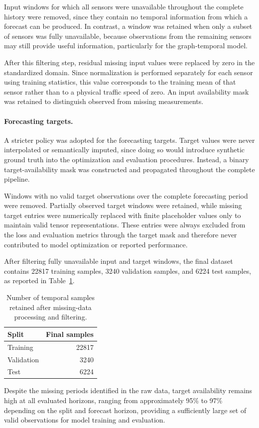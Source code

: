 Input windows for which all sensors were unavailable throughout the complete
history were removed, since they contain no temporal information from which a
forecast can be produced. In contrast, a window was retained when only a
subset of sensors was fully unavailable, because observations from the
remaining sensors may still provide useful information, particularly for the
graph-temporal model.

After this filtering step, residual missing input values were replaced by
zero in the standardized domain. Since normalization is performed separately
for each sensor using training statistics, this value corresponds to the
training mean of that sensor rather than to a physical traffic speed of zero.
An input availability mask was retained to distinguish observed from missing
measurements.

\paragraph{Forecasting targets.}

A stricter policy was adopted for the forecasting targets. Target values were
never interpolated or semantically imputed, since doing so would introduce
synthetic ground truth into the optimization and evaluation procedures.
Instead, a binary target-availability mask was constructed and propagated
throughout the complete pipeline.

Windows with no valid target observations over the complete forecasting
period were removed. Partially observed target windows were retained, while
missing target entries were numerically replaced with finite placeholder
values only to maintain valid tensor representations. These entries were
always excluded from the loss and evaluation metrics through the target
mask and therefore never contributed to model optimization or reported
performance.

After filtering fully unavailable input and target windows, the final dataset
contains 22817 training samples, 3240 validation samples, and 6224 test
samples, as reported in Table~\ref{tab:final_dataset}.

\begin{table}[t]
    \centering
    \caption{Number of temporal samples retained after missing-data
    processing and filtering.}
    \label{tab:final_dataset}
    \begin{tabular}{lr}
        \toprule
        Split & Final samples \\
        \midrule
        Training   & 22817 \\
        Validation & 3240 \\
        Test       & 6224 \\
        \bottomrule
    \end{tabular}
\end{table}
Despite the missing periods identified in the raw data,
target availability remains high at all evaluated horizons,
ranging from approximately 95\% to 97\% depending on the split and forecast
horizon, providing a sufficiently large set of valid
observations for model training and evaluation.


